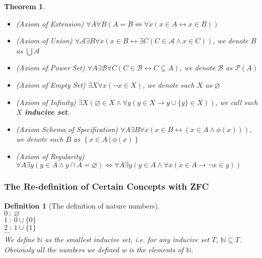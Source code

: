 \documentclass{ctexart}
\newcommand{\。}{．} %
\newcommand{\NN}{\mathbb{N}} %
\newenvironment{lvse}{
    \begin{tcolorbox}[enhanced, breakable, colback=qlv, boxrule=0pt, frame hidden,
        borderline west={0.7mm}{0.1mm}{slv}]
    }
    {\end{tcolorbox}}
\newenvironment{huangse}{
    \begin{tcolorbox}[enhanced, breakable, colback=qhuang, boxrule=0pt, frame hidden,
        borderline west={0.7mm}{0.1mm}{shuang}]
    }
    {\end{tcolorbox}}
\theoremstyle{t} %
\newtheorem{dyhj}{\color{slv} Definition}[subsection] %
\newtheorem{dlhj}{\color{shuang} Theorem}[subsection]
\newenvironment{dy}{\begin{lvse}\begin{dyhj}}{\end{dyhj}\end{lvse}}
\newenvironment{dl}{\begin{huangse}\begin{dlhj}}{\end{dlhj}\end{huangse}}
\begin{document}
\begin{dl}\quad
    \begin{itemize}
        \item (Axiom of Extension) $\forall A \forall B (A = B \Leftrightarrow \forall x (x \in A \leftrightarrow x \in B))$
        \item (Axiom of Union) $\forall \mathcal{A} \exists B \forall x (x \in B \leftrightarrow \exists C (C \in \mathcal{A} \land x \in C))$, we denote $B$ as $\bigcup \mathcal{A}$
        \item (Axiom of Power Set) $\forall A \exists \mathcal{B} \forall C(C \in \mathcal{B} \leftrightarrow C \subseteq A)$, we denote $\mathcal{B}$ as $\mathcal{P}(A)$
        \item (Axiom of Empty Set) $\exists X \forall x(\lnot x \in X)$, we denote such $X$ as $\varnothing$
        \item (Axiom of Infinity) $\exists X(\varnothing \in X \land \forall y(y \in X \rightarrow y \cup \{y\} \in X))$, we call such $X$ \textbf{inducive set}.
        \item (Axiom Schema of Specification) $\forall A \exists B \forall x (x \in B \leftrightarrow (x \in A \land \phi(x)))$, we denote such $B$ as $\left\{x \in A\ |\ \phi(x)\right\}$
        \item (Axiom of Regularity) $\forall A \exists y(y \in A \land y \cap A = \varnothing) \Leftrightarrow \forall A \exists y(y \in A \land \forall x (x \in A \rightarrow \lnot x \in y))$
    \end{itemize}
\end{dl}

\subsubsection{The Re-definition of Certain Concepts with ZFC}

\begin{dy}[The definition of nature numbers]\quad \\
    $0\ :\ \varnothing$ \\
    $1\ :\ 0 \cup \{0\}$ \\
    $2\ :\ 1 \cup \{1\}$ \\
    $\cdots$ \\
    We define $\NN$ as the smallest inducive set, i.e. for any inducive set $T$, $\NN \subseteq T$. \\
    Obviously all the numbers we defined w is the elements of $\NN$.
\end{dy}
\end{document}
